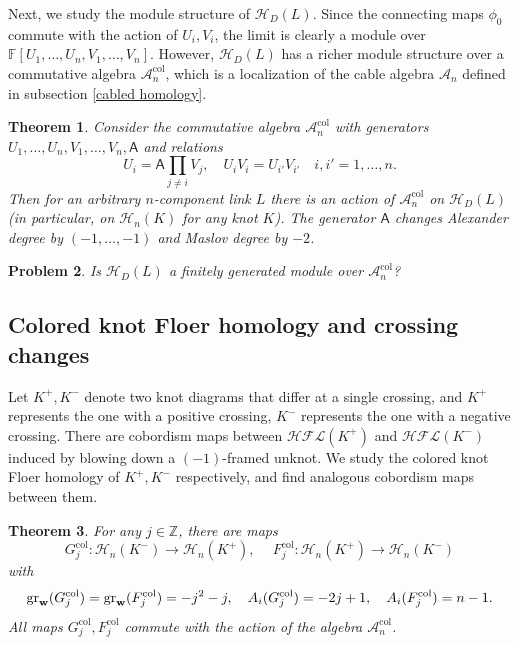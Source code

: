 \documentclass{amsart}
\newtheorem{theorem}{Theorem}[section]
\newtheorem{problem}[theorem]{Problem}
\newcommand{\CA}{\mathcal{A}}
\newcommand{\CH}{\mathcal{H}}
\newcommand{\col}{\mathrm{col}}
\newcommand{\F}{\mathbb{F}}
\newcommand{\cHFL}{\mathcal{H\!F\! L}}
\newcommand{\HD}{\mathcal{H}}
\newcommand{\w}{\mathbf{w}}
\def\gr{\textup{gr}}
\def\w{{\bf{w}}}
\newcommand{\Z}{\mathbb{Z}}
\newcommand{\AAA}{\mathsf{A}}
\begin{document}
Next, we study the module structure of $\HD_{D}(L)$. Since the connecting maps $\phi_0$ commute with the action of $U_i,V_i$, the limit is clearly a module over $\F[U_1,\ldots,U_n,V_1,\ldots,V_n]$. However, $\HD_{D}(L)$ has a richer module structure over a commutative algebra $\CA_n^{\col}$, which is a localization of the cable algebra $\CA_n$ defined in subsection \ref{cabled homology}. 

\begin{theorem}
\label{thm: intro module}
Consider the commutative algebra $\CA_n^{\col}$ with generators $U_1,\ldots,U_n,V_1,\ldots,V_n,\AAA$ and relations
\begin{equation}
\label{eq: colored algebra intro}
U_i=\AAA\prod_{j\neq i}V_j, \quad U_iV_i=U_{i'} V_{i'}\quad i, i'=1,\ldots,n.
\end{equation}
Then for an arbitrary $n$-component link $L$ there is an action of $\CA_n^{\col}$ on $\HD_{D}(L)$ (in particular, on $\HD_n(K)$ for any knot $K$).
The generator $\AAA$ changes Alexander degree by $(-1,\ldots,-1)$ and Maslov degree by $-2$.
\end{theorem}



\begin{problem}
\label{prob: intro finitely generated}
Is $\HD_{D}(L)$ a finitely generated module over $\CA_n^{\col}$?
\end{problem}

 
\subsection{Colored knot Floer homology and crossing changes}

Let $K^+, K^-$ denote two knot diagrams that differ at a single crossing, and $K^+$ represents the one with a positive crossing, $K^-$ represents the one with a negative crossing. There are cobordism maps between $\cHFL(K^+)$ and $\cHFL(K^-)$ induced by blowing down a $(-1)$-framed unknot. We study the colored knot Floer homology of $K^+, K^-$ respectively, and find analogous cobordism maps between them. 

\begin{theorem}\label{thm:colored crossing change}
For any $j\in \Z$, there are maps 
$$
G_j^{\col}:\CH_n(K^{-})\to \CH_n(K^+), \quad \ F_j^{\col}: \CH_n(K^+)\to \CH_n(K^-)
$$
with 
$$
\gr_{\w}(G_j^{\col})=\gr_{\w}(F_j^{\col})=-j^2-j,\quad A_i(G_j^{\col})=-2j+1, \quad A_i(F_j^{\col})=n-1.
$$
All maps $G_j^{\col}, F_j^{\col}$ commute with the action of the algebra $\CA_n^{\col}$. 
\end{theorem}
\end{document}
